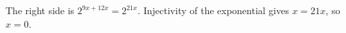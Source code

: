 The right side is $2^{9x+12x}=2^{21x}$. Injectivity of the exponential gives $x=21x$, so $\boxed{x=0}$.
